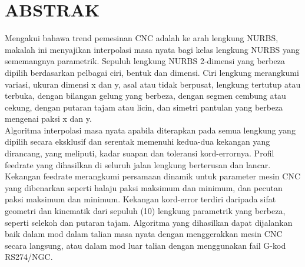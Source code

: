 \chapter{ABSTRAK}

\begin{singlespace}

	
\noindent
Mengakui bahawa trend pemesinan CNC adalah ke arah lengkung NURBS, makalah ini menyajikan interpolasi masa nyata bagi kelas lengkung NURBS yang sememangnya parametrik. Sepuluh lengkung NURBS 2-dimensi yang berbeza dipilih berdasarkan pelbagai ciri, bentuk dan dimensi. Ciri lengkung merangkumi variasi, ukuran dimensi x dan y, asal atau tidak berpusat, lengkung tertutup atau terbuka, dengan bilangan gelung yang berbeza, dengan segmen cembung atau cekung, dengan putaran tajam atau licin, dan simetri pantulan yang berbeza mengenai paksi x dan y.\\

\noindent
Algoritma interpolasi masa nyata apabila diterapkan pada semua lengkung yang dipilih secara eksklusif dan serentak memenuhi kedua-dua kekangan yang dirancang, yang meliputi, kadar suapan dan toleransi kord-errornya. Profil feedrate yang dihasilkan di seluruh jalan lengkung berterusan dan lancar. Kekangan feedrate merangkumi persamaan dinamik untuk parameter mesin CNC yang dibenarkan seperti halaju paksi maksimum dan minimum, dan pecutan paksi maksimum dan minimum. Kekangan kord-error terdiri daripada sifat geometri dan kinematik dari sepuluh (10) lengkung parametrik yang berbeza, seperti selekoh dan putaran tajam. Algoritma yang dihasilkan dapat dijalankan baik dalam mod dalam talian masa nyata dengan menggerakkan mesin CNC secara langsung, atau dalam mod luar talian dengan menggunakan fail G-kod RS274/NGC. 


\end{singlespace}